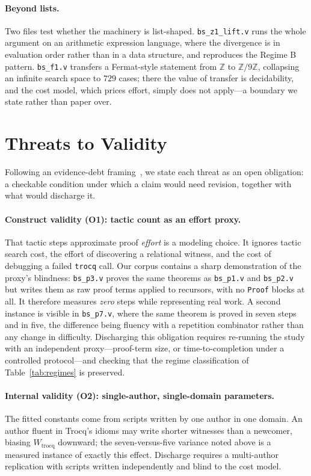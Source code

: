 \documentclass[runningheads]{llncs}
\begin{document}
\paragraph{Beyond lists.} Two files test whether the machinery is
list-shaped. \texttt{bs\_z1\_lift.v} runs the whole argument on an arithmetic
expression language, where the divergence is in evaluation order rather than
in a data structure, and reproduces the Regime B pattern. \texttt{bs\_f1.v}
transfers a Fermat-style statement from $\mathbb{Z}$ to
$\mathbb{Z}/9\mathbb{Z}$, collapsing an infinite search space to $729$ cases;
there the value of transfer is decidability, and the cost model, which prices
effort, simply does not apply---a boundary we state rather than paper over.


\section{Threats to Validity}
\label{sec:ttv}

Following an evidence-debt framing~\cite{alves2025evidencedebt}, we state each
threat as an open obligation: a checkable condition under which a claim would
need revision, together with what would discharge it.

\paragraph{Construct validity (O1): tactic count as an effort proxy.}
That tactic steps approximate proof \emph{effort} is a modeling choice. It
ignores tactic search cost, the effort of discovering a relational witness,
and the cost of debugging a failed \texttt{trocq} call. Our corpus contains a
sharp demonstration of the proxy's blindness: \texttt{bs\_p3.v} proves the
same theorems as \texttt{bs\_p1.v} and \texttt{bs\_p2.v} but writes them as
raw proof terms applied to recursors, with no \texttt{Proof} blocks at all.
It therefore measures \emph{zero} steps while representing real work. A
second instance is visible in \texttt{bs\_p7.v}, where the same theorem is
proved in seven steps and in five, the difference being fluency with a
repetition combinator rather than any change in difficulty. Discharging this
obligation requires re-running the study with an independent proxy---proof-term
size, or time-to-completion under a controlled protocol---and checking that
the regime classification of Table~\ref{tab:regimes} is preserved.

\paragraph{Internal validity (O2): single-author, single-domain parameters.}
The fitted constants come from scripts written by one author in one domain.
An author fluent in Trocq's idioms may write shorter witnesses than a
newcomer, biasing $W_{\text{trocq}}$ downward; the seven-versus-five variance
noted above is a measured instance of exactly this effect. Discharge requires
a multi-author replication with scripts written independently and blind to
the cost model.
\end{document}
